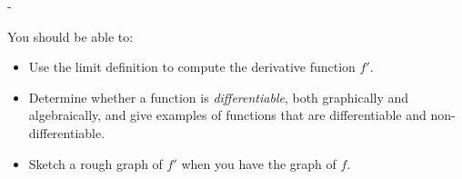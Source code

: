 \documentclass{article}
\makeatletter
\newlength{\tipmargin}
\renewenvironment{framed}{
  \setlength{\tipmargin}{\textwidth-\linewidth}
  \advance\@totalleftmargin-\tipmargin
  \def\FrameCommand{\hspace{\tipmargin}\fbox}%
  \advance\linewidth\tipmargin
  \MakeFramed {\advance\hsize-\width \FrameRestore}%
}
{\endMakeFramed}
\makeatother
\begin{document}

\begin{problemonly}
  \begin{framed}

You should be able to:
    \begin{itemize}[topsep=0pt,partopsep=0pt,parsep=8pt,itemsep=0pt]
    \item Use the limit definition to compute the derivative function
      $f'$.

    \item Determine whether a function is \emph{differentiable}, both
      graphically and algebraically, and give examples of functions that
      are differentiable and non-differentiable.

    \item Sketch a rough graph of $f'$ when you have the graph of $f$. 

    \end{itemize}
  \end{framed}
\end{problemonly}
\end{document}
